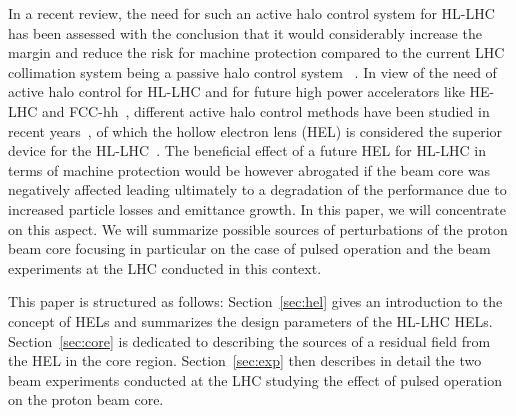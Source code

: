 \documentclass[%
 reprint,
 amsmath,amssymb,
 aps,
prstab,
]{revtex4-1}
\begin{document}
In a recent review, the need for such an active halo control system for HL-LHC has been assessed with the conclusion that it would considerably increase the margin and reduce the risk for machine protection compared to the current LHC collimation system being a passive halo control system ~\cite{helreview}. In view of the need of active halo control for HL-LHC and for future high power accelerators like HE-LHC and FCC-hh~\cite{helhcparam2011,fcc_coll_ipac2017}, different active halo control methods have been studied in recent years~\cite{helreview_bruce}, of which the hollow electron lens (HEL) is considered the superior device for the HL-LHC~\cite{helreview}. The beneficial effect of a future HEL for HL-LHC in terms of machine protection would be however abrogated if the beam core was negatively affected leading ultimately to a degradation of the performance due to increased particle losses and emittance growth. In this paper, we will concentrate on this aspect. We will summarize possible sources of perturbations of the proton beam core focusing in particular on the case of pulsed operation and the beam experiments at the LHC conducted in this context.

This paper is structured as follows: Section~\ref{sec:hel} gives an introduction to the concept of HELs and summarizes the design parameters of the HL-LHC HELs. Section~\ref{sec:core} is dedicated to describing the sources of a residual field from the HEL in the core region. Section~\ref{sec:exp} then describes in detail the two beam experiments conducted at the LHC studying the effect of pulsed operation on the proton beam core.

\end{document}
